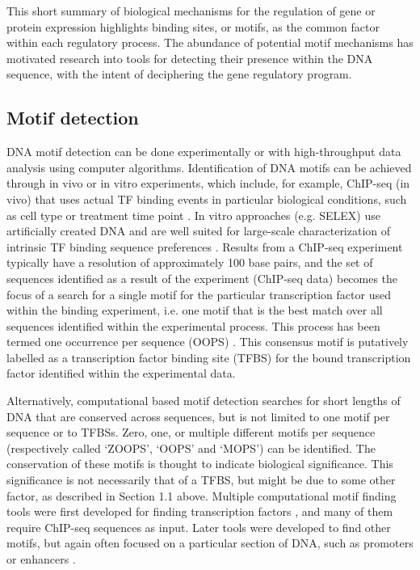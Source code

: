 \documentclass[12pt]{article}
\begin{document}
This short summary of biological mechanisms for the regulation of gene or protein expression highlights binding sites, or motifs, as the common factor within each regulatory process. The abundance of potential motif mechanisms has motivated research into tools for detecting their presence within the DNA sequence, with the intent of deciphering the gene regulatory program. 

\subsection{Motif detection}
DNA motif detection can be done experimentally or with high-throughput data analysis using computer algorithms. Identification of DNA motifs can be achieved through in vivo or in vitro experiments, which include, for example, ChIP-seq (in vivo) that uses actual TF binding events in particular biological conditions, such as cell type or treatment time point \citep{inukai2017transcription}. In vitro approaches (e.g. SELEX) use artificially created DNA and are well suited for large-scale characterization of intrinsic TF binding sequence preferences \citep{inukai2017transcription}.  Results from a ChIP-seq experiment typically have a resolution of approximately 100 base pairs, and the set of sequences identified as a result of the experiment (ChIP-seq data) becomes the focus of a search for a single motif for the particular transcription factor used within the binding experiment, i.e. one motif that is the best match over all sequences identified within the experimental process. This process has been termed one occurrence per sequence (OOPS) \citep{zhang2016entropy}. This consensus motif is putatively labelled as a transcription factor binding site (TFBS) for the bound transcription factor identified within the experimental data. 

Alternatively, computational based motif detection searches for short lengths of DNA that are conserved across sequences, but is not limited to one motif per sequence or to TFBSs. Zero, one, or multiple different motifs per sequence (respectively called `ZOOPS', `OOPS' and `MOPS') can be identified. The conservation of these motifs is thought to indicate biological significance. This significance is not necessarily that of a TFBS, but might be due to some other factor, as described in Section 1.1 above. 
Multiple computational motif finding tools were first developed for finding transcription factors \citep{dassi2016dynamit}, and many of them require ChIP-seq sequences as input. Later tools were developed to find other motifs, but again often focused on a particular section of DNA, such as promoters or enhancers  \citep{boeva2016analysis}.
\end{document}
